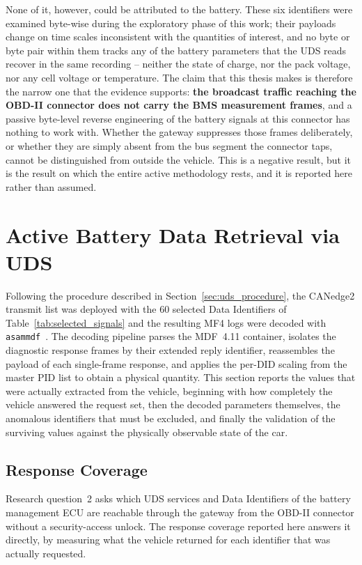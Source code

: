 \documentclass[11pt,a4paper,oneside,parskip=half]{scrreprt}
\begin{document}
None of it, however, could be attributed to the battery. These six identifiers were examined byte-wise during the exploratory phase of this work; their payloads change on time scales inconsistent with the quantities of interest, and no byte or byte pair within them tracks any of the battery parameters that the UDS reads recover in the same recording -- neither the state of charge, nor the pack voltage, nor any cell voltage or temperature. The claim that this thesis makes is therefore the narrow one that the evidence supports: \textbf{the broadcast traffic reaching the OBD-II connector does not carry the BMS measurement frames}, and a passive byte-level reverse engineering of the battery signals at this connector has nothing to work with. Whether the gateway suppresses those frames deliberately, or whether they are simply absent from the bus segment the connector taps, cannot be distinguished from outside the vehicle. This is a negative result, but it is the result on which the entire active methodology rests, and it is reported here rather than assumed.

\section{Active Battery Data Retrieval via UDS}
Following the procedure described in Section~\ref{sec:uds_procedure}, the CANedge2 transmit list was deployed with the 60 selected Data Identifiers of Table~\ref{tab:selected_signals} and the resulting MF4 logs were decoded with \texttt{asammdf}~\cite{asammdf}. The decoding pipeline parses the MDF~4.11 container, isolates the diagnostic response frames by their extended reply identifier, reassembles the payload of each single-frame response, and applies the per-DID scaling from the master PID list to obtain a physical quantity. This section reports the values that were actually extracted from the vehicle, beginning with how completely the vehicle answered the request set, then the decoded parameters themselves, the anomalous identifiers that must be excluded, and finally the validation of the surviving values against the physically observable state of the car.

\subsection{Response Coverage}
\label{ssec:coverage}
Research question~2 asks which UDS services and Data Identifiers of the battery management ECU are reachable through the gateway from the OBD-II connector without a security-access unlock. The response coverage reported here answers it directly, by measuring what the vehicle returned for each identifier that was actually requested.
\end{document}
